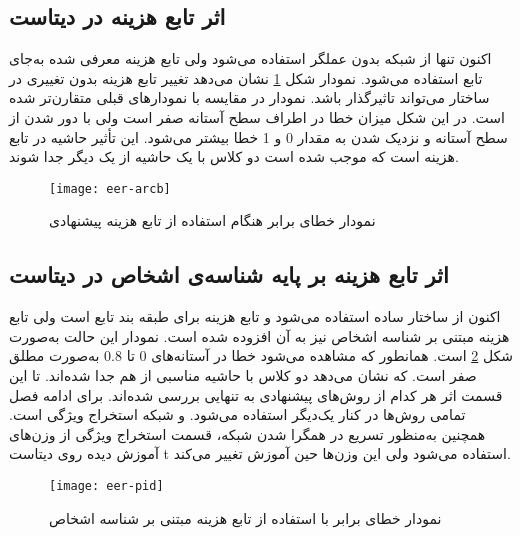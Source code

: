 \subsection{اثر تابع هزینه  در دیتاست }
اکنون تنها از شبکه  بدون عملگر  استفاده می‌شود ولی تابع هزینه  معرفی شده به‌جای تابع  استفاده می‌شود. نمودار شکل
\ref{fig:eer-arcb}
نشان می‌دهد تغییر تابع هزینه بدون تغییری در ساختار می‌تواند تاثیرگذار باشد. نمودار در مقایسه با نمودارهای قبلی متقارن‌تر شده است. در این شکل میزان خطا در اطراف سطح آستانه صفر است ولی با دور شدن از سطح آستانه و نزدیک شدن به مقدار 0 و 1 خطا بیشتر می‌شود. این تأثیر حاشیه در تابع هزینه  است که موجب شده است دو کلاس با یک حاشیه از یک دیگر جدا شوند.

\begin{figure}[h]
	\centerline{\texttt{[image: eer-arcb]}}
	\caption{نمودار خطای برابر هنگام استفاده از تابع هزینه  پیشنهادی}
	\label{fig:eer-arcb}
\end{figure}

\subsection{اثر تابع هزینه بر پایه شناسه‌ی اشخاص در دیتاست }
اکنون از ساختار ساده  استفاده می‌شود و تابع هزینه برای طبقه بند تابع  است ولی تابع هزینه مبتنی بر شناسه اشخاص نیز به آن افزوده شده است. نمودار این حالت به‌صورت شکل 
\ref{fig:eer-pid}
است. همانطور که مشاهده می‌شود خطا در آستانه‌های 0 تا 0.8 به‌صورت مطلق صفر است. که نشان می‌دهد دو کلاس با حاشیه مناسبی از هم جدا شده‌اند. تا این قسمت اثر هر کدام از روش‌های پیشنهادی به تنهایی بررسی شده‌اند. برای ادامه فصل تمامی روش‌ها در کنار یک‌دیگر استفاده می‌شود. و شبکه استخراج ویژگی  است. همچنین به‌منظور تسریع در همگرا شدن شبکه، قسمت استخراج ویژگی از وزن‌های آموزش دیده روی دیتاست t استفاده می‌شود ولی این وزن‌ها حین آموزش تغییر می‌کند.
\begin{figure}[h]
	\centerline{\texttt{[image: eer-pid]}}
	\caption{نمودار خطای برابر با استفاده از تابع هزینه مبتنی بر شناسه اشخاص}
	\label{fig:eer-pid}
\end{figure}

